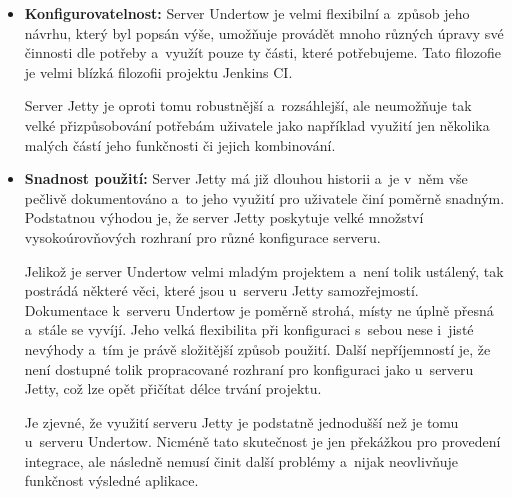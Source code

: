 \begin{itemize}
                \item{\textbf{Konfigurovatelnost:} Server Undertow je velmi flexibilní a~způsob
                    jeho návrhu, který byl popsán výše, umožňuje provádět mnoho různých úpravy 
                    své činnosti dle potřeby a~využít pouze ty části, které potřebujeme.
                    Tato filozofie je velmi blízká filozofii projektu Jenkins CI. 
                    
                    Server Jetty
                    je oproti tomu robustnější a~rozsáhlejší, ale neumožňuje tak velké přizpůsobování potřebám
                    uživatele jako například využití jen několika malých částí jeho funkčnosti či jejich
                    kombinování. }


                \item{\textbf{Snadnost použití:}}                      
                    Server Jetty má již dlouhou historii a~je v~něm vše pečlivě dokumentováno
                    a~to jeho využití pro uživatele činí poměrně snadným. Podstatnou výhodou je, že
                    server Jetty poskytuje velké množství vysokoúrovňových rozhraní
                    pro různé konfigurace serveru.
                    
                    Jelikož je server Undertow velmi mladým projektem a~není tolik ustálený, 
                    tak postrádá některé věci,
                    které jsou u~serveru Jetty samozřejmostí. 
                    Dokumentace k~serveru
                    Undertow je poměrně strohá, místy ne úplně přesná a~stále se vyvíjí. 
                    Jeho velká flexibilita při konfiguraci s~sebou nese i~jisté nevýhody
                    a~tím je právě složitější způsob použití. Další nepříjemností je, že není
                    dostupné tolik propracované rozhraní pro konfiguraci jako u~serveru Jetty,
                    což lze opět přičítat délce trvání projektu.

                    Je zjevné, že využití serveru Jetty je podstatně jednodušší než je tomu
                    u~serveru Undertow. Nicméně tato skutečnost je jen překážkou pro provedení
                    integrace, ale následně nemusí činit další problémy a~nijak neovlivňuje
                    funkčnost výsledné aplikace.

            \end{itemize}
        

